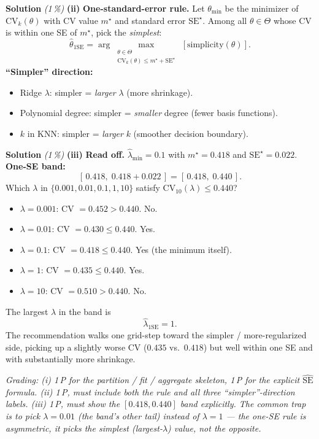 \documentclass[11pt,a4paper]{article}
\newcommand{\subpoints}[1]{\textit{(#1\,\%)}}
\newcommand{\sol}{\noindent\textbf{Solution}}
\begin{document}
\medskip
\sol{} \subpoints{1} \textbf{(ii)} \textbf{One-standard-error rule.} Let $\theta_{\min}$ be the
minimizer of $\mathrm{CV}_k(\theta)$ with CV value $m^\star$ and standard error $\mathrm{SE}^\star$.
Among all $\theta \in \Theta$ whose CV is within one SE of $m^\star$, pick the \emph{simplest}:
$$\hat\theta_{1\mathrm{SE}} = \arg\!\max_{\substack{\theta \in \Theta \\[1pt] \mathrm{CV}_k(\theta)
\le m^\star + \mathrm{SE}^\star}}\, [\text{simplicity}(\theta)].$$
\textbf{``Simpler'' direction:}
\begin{itemize}
  \item Ridge $\lambda$: simpler = \emph{larger} $\lambda$ (more shrinkage).
  \item Polynomial degree: simpler = \emph{smaller} degree (fewer basis functions).
  \item $k$ in KNN: simpler = \emph{larger} $k$ (smoother decision boundary).
\end{itemize}

\medskip
\sol{} \subpoints{1} \textbf{(iii)} \textbf{Read off.}
$\hat\lambda_{\min} = \boxed{0.1}$ with $m^\star = 0.418$ and $\mathrm{SE}^\star = 0.022$.
\textbf{One-SE band:}
$$[\,0.418,\;0.418 + 0.022\,] = [\,0.418,\;0.440\,].$$
Which $\lambda$ in $\{0.001, 0.01, 0.1, 1, 10\}$ satisfy $\mathrm{CV}_{10}(\lambda) \le 0.440$?
\begin{itemize}
  \item $\lambda = 0.001$: CV $= 0.452 > 0.440$. No.
  \item $\lambda = 0.01$: CV $= 0.430 \le 0.440$. Yes.
  \item $\lambda = 0.1$: CV $= 0.418 \le 0.440$. Yes (the minimum itself).
  \item $\lambda = 1$: CV $= 0.435 \le 0.440$. Yes.
  \item $\lambda = 10$: CV $= 0.510 > 0.440$. No.
\end{itemize}
The largest $\lambda$ in the band is
$$\boxed{\;\hat\lambda_{1\mathrm{SE}} = 1.\;}$$
The recommendation walks one grid-step toward the simpler / more-regularized side, picking up a
slightly worse CV ($0.435$ vs.\ $0.418$) but well within one SE and with substantially more
shrinkage.

\noindent\emph{Grading: (i) 1\,P for the partition / fit / aggregate skeleton, 1\,P for the explicit
$\widehat{\mathrm{SE}}$ formula. (ii) 1\,P, must include both the rule and all three
``simpler''-direction labels. (iii) 1\,P, must show the $[0.418, 0.440]$ band explicitly. The
common trap is to pick $\lambda = 0.01$ (the band's other tail) instead of $\lambda = 1$ --- the
one-SE rule is asymmetric, it picks the \emph{simplest} (largest-$\lambda$) value, not the
opposite.}
\end{document}
